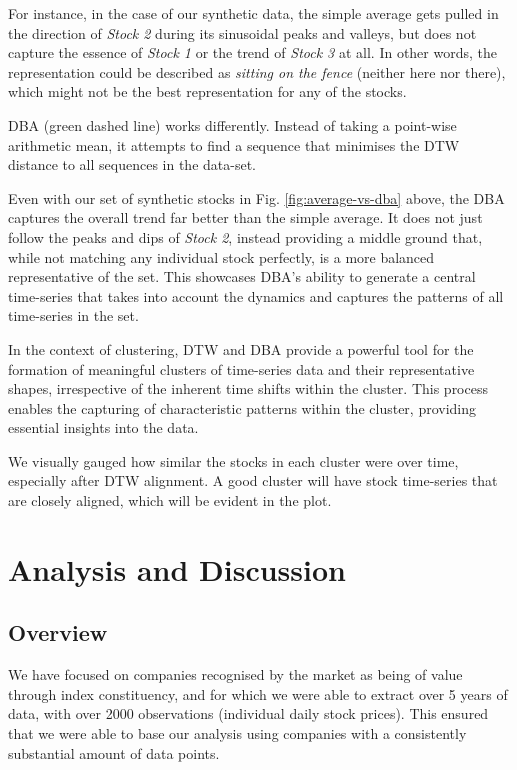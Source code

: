 \documentclass[11pt]{article}
\begin{document}
For instance, in the case of our synthetic data, the simple average gets pulled in the direction of \textit{Stock 2} during its sinusoidal peaks and valleys, but does not capture the essence of \textit{Stock 1} or the trend of \textit{Stock 3} at all. In other words, the representation could be described as \textit{sitting on the fence} (neither here nor there), which might not be the best representation for any of the stocks.

DBA (green dashed line) works differently. Instead of taking a point-wise arithmetic mean, it attempts to find a sequence that minimises the DTW distance to all sequences in the data-set.

Even with our set of synthetic stocks in Fig. \ref{fig:average-vs-dba} above, the DBA captures the overall trend far better than the simple average. It does not just follow the peaks and dips of \textit{Stock 2}, instead providing a middle ground that, while not matching any individual stock perfectly, is a more balanced representative of the set. This showcases DBA's ability to generate a central time-series that takes into account the dynamics and captures the patterns of all time-series in the set.

In the context of clustering, DTW and DBA provide a powerful tool for the formation of meaningful clusters of time-series data and their representative shapes, irrespective of the inherent time shifts within the cluster. This process enables the capturing of characteristic patterns within the cluster, providing essential insights into the data.

We visually gauged how similar the stocks in each cluster were over time, especially after DTW alignment. A good cluster will have stock time-series that are closely aligned, which will be evident in the plot.

\section{Analysis and Discussion}

\subsection{Overview}

We have focused on companies recognised by the market as being of value through index constituency, and for which we were able to extract over 5 years of data, with over 2000 observations (individual daily stock prices). This ensured that we were able to base our analysis using companies with a consistently substantial amount of data points. 
\end{document}
